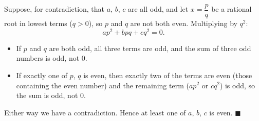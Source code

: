 Suppose, for contradiction, that $a$, $b$, $c$ are all odd, and let $x=\dfrac {p}{q}$ be a rational root in lowest terms ($q>0$), so $p$ and $q$ are not both even. Multiplying by $q^2$:
\[
ap^2+bpq+cq^2=0 .
\]
\begin{itemize}
\item If $p$ and $q$ are both odd, all three terms are odd, and the sum of three odd numbers is odd, not $0$.
\item If exactly one of $p$, $q$ is even, then exactly two of the terms are even (those containing the even number) and the remaining term ($ap^2$ or $cq^2$) is odd, so the sum is odd, not $0$.
\end{itemize}
Either way we have a contradiction. Hence at least one of $a$, $b$, $c$ is even. $\blacksquare$
